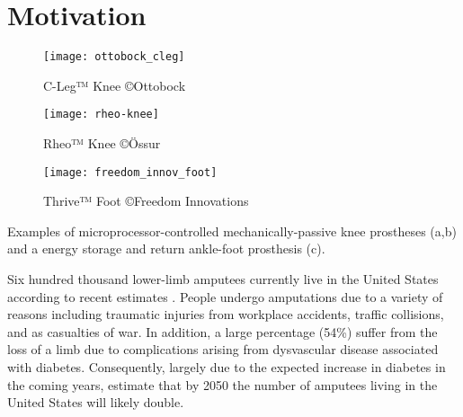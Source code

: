 \section{Motivation}\label{sec:intro_motivation}
\begin{marginfigure}[1in]
    \centering
	\begin{subfigure}[b]{\textwidth}
    	\centering
        \texttt{[image: ottobock\_cleg]}
        \caption{C-Leg™ Knee ©Ottobock}\label{fig:ottobock_cleg}
        \vspace{0.25in}
	\end{subfigure}
	\begin{subfigure}[b]{\textwidth}
    	\centering
        \texttt{[image: rheo-knee]}
        \caption{Rheo™  Knee ©Össur}\label{fig:ossur_rheo}
        \vspace{0.25in}
	\end{subfigure}
	\begin{subfigure}[b]{\textwidth}
    	\centering
        \texttt{[image: freedom\_innov\_foot]}
        \caption{Thrive™ Foot ©Freedom
        Innovations}\label{fig:freedom_innovations_foot}
	\end{subfigure}
    \caption[Examples of microprocessor-controlled mechanically-passive knee
    prostheses]{Examples of microprocessor-controlled mechanically-passive knee
    prostheses (a,b) and a energy storage and return ankle-foot prosthesis (c).}
\end{marginfigure}
Six hundred thousand lower-limb amputees currently live in the United States
according to recent estimates \citep{ziegler2008estimating}.  People undergo
amputations due to a variety of reasons including traumatic injuries from
workplace accidents, traffic collisions, and as casualties of war.  In addition,
a large percentage (54\%) suffer from the loss of a limb due to complications
arising from dysvascular disease associated with diabetes.  Consequently,
largely due to the expected increase in diabetes in the coming years,
\citet{ziegler2008estimating} estimate that by 2050 the number of amputees
living in the United States will likely double.

